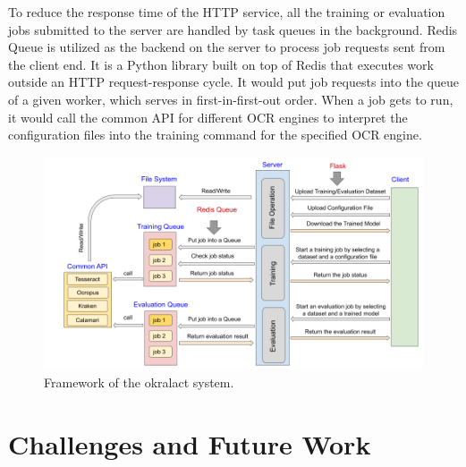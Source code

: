 \documentclass[conference]{IEEEtran}
\begin{document}
To reduce the response time of the HTTP service, all the training or evaluation
jobs submitted to the server are handled by task queues in the background.
Redis Queue is utilized as the backend on the server to process job requests
sent from the     client end. It is a Python library built on top of Redis that
executes work  outside an HTTP request-response cycle.  It would put job
requests into the      queue of a given worker, which serves in
first-in-first-out order. When a job   gets to run, it would call the common
API for different OCR engines to interpret the configuration files into the
training command for the specified OCR engine.

\begin{figure}[ht!]
        \begin{center}
     \includegraphics[width=0.8\linewidth]{Figures/Framework.png}
        \end{center}
        \caption{\small{Framework of the okralact system.}}
\label{fig:framework}
\end{figure}

\section*{Challenges and Future Work}




\end{document}
